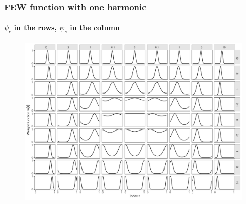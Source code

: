 \documentclass{snedecorbeamer}
\begin{document}
\begin{frame}%
  \label{frm:FEW-G1-span}
  \frametitle{FEW function with one harmonic}
  \framesubtitle{$\psi_{c}$ in the rows, $\psi_{s}$ in the column}

  \begin{figure}
    \centering
    \includegraphics[width=.65\textwidth]{FEW-G1-span}
  \end{figure}
\end{frame}
\end{document}
